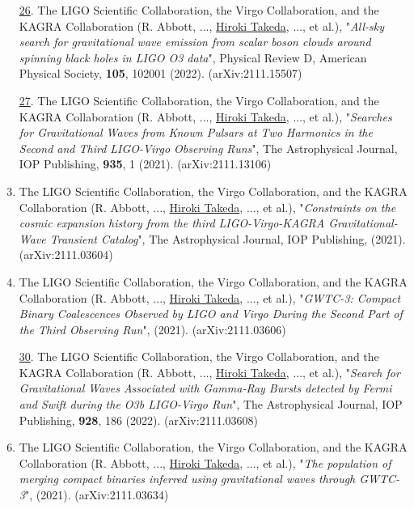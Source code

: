 \documentclass[uplatex, 12pt]{article}
\begin{document}
\begin{enumerate}
\item[\uline{26}.] The LIGO Scientific Collaboration, the Virgo Collaboration, and the KAGRA Collaboration (R. Abbott, ..., \uline{Hiroki Takeda}, ..., et al.), "\emph{All-sky search for gravitational wave emission from scalar boson clouds around spinning black holes in LIGO O3 data}", Physical Review D, American Physical Society, {\bf 105}, 102001 (2022). (arXiv:2111.15507)\\

\item[\uline{27}.] The LIGO Scientific Collaboration, the Virgo Collaboration, and the KAGRA Collaboration (R. Abbott, ..., \uline{Hiroki Takeda}, ..., et al.), "\emph{Searches for Gravitational Waves from Known Pulsars at Two Harmonics in the Second and Third LIGO-Virgo Observing Runs}", The Astrophysical Journal, IOP Publishing, {\bf935}, 1 (2021). (arXiv:2111.13106)\\

\setcounter{enumi}{27}
\item The LIGO Scientific Collaboration, the Virgo Collaboration, and the KAGRA Collaboration (R. Abbott, ..., \uline{Hiroki Takeda}, ..., et al.), "\emph{Constraints on the cosmic expansion history from the third LIGO-Virgo-KAGRA Gravitational-Wave Transient Catalog}", The Astrophysical Journal, IOP Publishing, (2021). (arXiv:2111.03604)\\

\item The LIGO Scientific Collaboration, the Virgo Collaboration, and the KAGRA Collaboration (R. Abbott, ..., \uline{Hiroki Takeda}, ..., et al.), "\emph{GWTC-3: Compact Binary Coalescences Observed by LIGO and Virgo During the Second Part of the Third Observing Run}", (2021). (arXiv:2111.03606)\\

\item[\uline{30}.] The LIGO Scientific Collaboration, the Virgo Collaboration, and the KAGRA Collaboration (R. Abbott, ..., \uline{Hiroki Takeda}, ..., et al.),
"\emph{Search for Gravitational Waves Associated with Gamma-Ray Bursts detected by Fermi and Swift during the O3b LIGO-Virgo Run}",
The Astrophysical Journal, IOP Publishing, {\bf 928}, 186 (2022).
(arXiv:2111.03608) \\

\setcounter{enumi}{30}
\item The LIGO Scientific Collaboration, the Virgo Collaboration, and the KAGRA Collaboration (R. Abbott, ..., \uline{Hiroki Takeda}, ..., et al.), "\emph{The population of merging compact binaries inferred using gravitational waves through GWTC-3}", (2021). (arXiv:2111.03634)\\


\end{enumerate}
\end{document}
